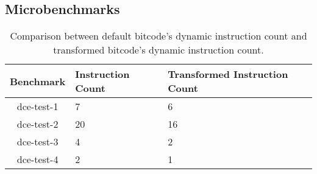 \subsection{Microbenchmarks}

\begin{table}[!ht]
\centering
\begin{tabular}{c|l|l}
  \toprule
  \textbf{Benchmark} & \textbf{Instruction Count} & \textbf{Transformed Instruction Count} \\
  \midrule
  dce-test-1 & 7  & 6  \\ 
  dce-test-2 & 20 & 16 \\
  dce-test-3 & 4  & 2  \\
  dce-test-4 & 2  & 1  \\
  \bottomrule
\end{tabular}
\caption{Comparison between default bitcode's dynamic instruction count and transformed
  bitcode's dynamic instruction count.}
\end{table}  

\newpage

